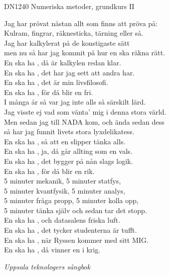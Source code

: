\documentclass[a6paper,10pt]{article}
\begin{document}
\setlength{\oddsidemargin}{-0.47in}
\noindent
\begin{center}
\footnotesize DN1240 Numeriska metoder, grundkurs II\\
\end{center}
Jag har prövat nästan allt som finns att pröva på:\\
Kulram, fingrar, räknesticka, tärning eller så.\\
Jag har kalkylerat på de konstigaste sätt\\
men nu så har jag kommit på hur en ska räkna rätt.
\vspace{5pt} \\
En ska ha , då är kalkylen redan klar.\\
En ska ha , det har jag sett att andra har.\\
En ska ha , det är min livsfilosofi.\\
En ska ha , för då blir en fri.
\vspace{5pt} \\
I många år så var jag inte alls så särskilt lärd.\\
Jag visste ej vad som vänta’ mig i denna stora värld.\\
Men sedan jag till NADA kom, och ända sedan dess\\
så har jag funnit livets stora lyxdelikatess.
\vspace{5pt} \\
En ska ha , så att en slipper tänka alls.\\
En ska ha , ja, då går allting som en vals.\\
En ska ha , det bygger på nån slags logik.\\
En ska ha , för då blir en rik.
\vspace{5pt} \\
5 minuter mekanik, 5 minuter statfys,\\
5 minuter kvantfysik, 5 minuter analys,\\
5 minuter fråga propp, 5 minuter kolla opp,\\
5 minuter tänka själv och sedan tar det stopp.
\vspace{5pt} \\
En ska ha , och datasalens friska luft.\\
En ska ha , det tycker studenterna är tufft.\\
En ska ha , när Ryssen kommer med sitt MIG.\\
En ska ha , då vinner en i krig.
\begin{flushright}
\textit{Uppsala teknologers sångbok}
\end{flushright}
\end{document}
